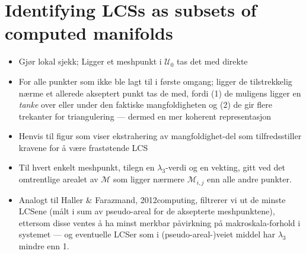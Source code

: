 \section{Identifying LCSs as subsets of computed manifolds}
\label{sec:identifying_lcss_as_subsets_of_computed_manifolds}

\begin{framed}
    \begin{itemize}
        \item Gjør lokal sjekk; Ligger et meshpunkt i $\mathcal{U}_{0}$ tas
            det med direkte
        \item For alle punkter som ikke ble lagt til i første omgang;
            ligger de tilstrekkelig nærme et allerede akseptert punkt tas
            de med, fordi (1) de muligens ligger en \emph{tanke} over eller
            under den faktiske mangfoldigheten og (2) de gir flere trekanter
            for triangulering --- dermed en mer koherent representasjon
        \item Henvis til figur som viser ekstrahering av mangfoldighet-del
            som tilfredsstiller kravene for å være frastøtende LCS
        \item Til hvert enkelt meshpunkt, tilegn en $\lambda_{3}$-verdi
            og en vekting, gitt ved det omtrentlige arealet av $\mathcal{M}$
            som ligger nærmere $\mathcal{M}_{i,j}$ enn alle andre punkter.


        \item Analogt til Haller \& Farazmand, 2012computing, filtrerer vi ut
            de minste LCSene (målt i sum av pseudo-areal for de aksepterte
            meshpunktene), ettersom disse ventes å ha minst merkbar påvirkning
            på makroskala-forhold i systemet --- og eventuelle LCSer som
            i (pseudo-areal-)veiet middel har $\lambda_{3}$ mindre enn 1.
    \end{itemize}
\end{framed}



